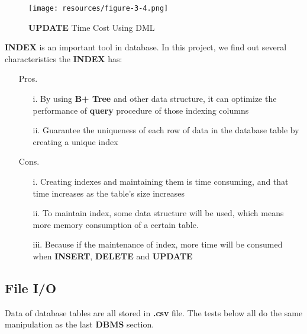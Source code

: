 \documentclass[onecolumn, oneside, ctexart, UTF8, b4paper]{SUSTechHomework}
\begin{document}
\begin{figure}[H]
    \centering
    \texttt{[image: resources/figure-3-4.png]}
    \caption{\textbf{UPDATE} Time Cost Using DML}
    \label{fig5}
\end{figure}

\textbf{INDEX} is an important tool in database. In this project, we find out several characteristics the \textbf{INDEX} has:

\begin{enumerate}
    \item [Pros.]
    \begin{enumerate}
        \item [i.]
        By using \textbf{B+ Tree} and other data structure, it can optimize the performance of \textbf{query} procedure of those indexing columns
        \item [ii.]
        Guarantee the uniqueness of each row of data in the database table by creating a unique index
    \end{enumerate}
    \item [Cons.]
    \begin{enumerate}
        \item [i.]
        Creating indexes and maintaining them is time consuming, and that time increases as the table's size increases
        \item [ii.]
        To maintain index, some data structure will be used, which means more memory consumption of a certain table.
        \item [iii.]
        Because if the maintenance of index, more time will be consumed when \textbf{INSERT}, \textbf{DELETE} and \textbf{UPDATE}
    \end{enumerate}
\end{enumerate}

\subsection{\textbf{File I/O}}

Data of database tables are all stored in \textbf{.csv} file. The tests below all do the same manipulation as the last \textbf{DBMS} section.
\end{document}

